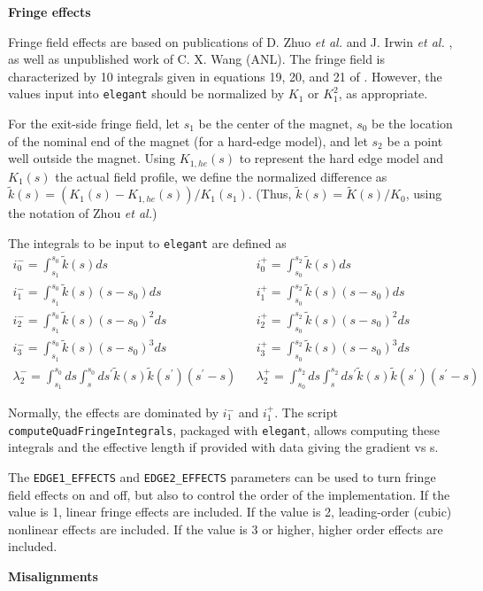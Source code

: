 {\bf Fringe effects}

Fringe field effects  are based on publications of D.  Zhuo {\em et al.} \cite{Zhou-IPAC10} and  J. Irwin {\em et
  al.} \cite{Irwin-PAC95}, as well as unpublished work of C. X. Wang (ANL).  The fringe field is characterized by 
10 integrals given in equations 19, 20, and 21 of \cite{Zhou-IPAC10}.  However, the values input into {\tt elegant}
should be normalized by $K_1$ or $K_1^2$, as appropriate.

For the exit-side fringe field, let $s_1$ be the center of the magnet, $s_0$ be the location of the nominal end of the magnet
(for a hard-edge model), and let $s_2$ be a point well outside the magnet.  
Using $K_{1,he}(s)$ to represent the hard edge model and $K_1(s)$ the actual field profile, we 
define the normalized difference as $\tilde{k}(s) = (K_1(s) - K_{1,he}(s))/K_1(s_1)$.  (Thus, $\tilde{k}(s) = \tilde{K}(s)/K_0$, using
the notation of Zhou {\em et al.})

The integrals to be input to {\tt elegant} are defined as 
\begin{eqnarray}
i_0^- = \int_{s_1}^{s_0} \tilde{k}(s) ds & & i_0^+ = \int_{s_0}^{s_2} \tilde{k}(s) ds \\
i_1^- = \int_{s_1}^{s_0} \tilde{k}(s) (s-s_0) ds & & i_1^+ = \int_{s_0}^{s_2} \tilde{k}(s) (s-s_0) ds \\
i_2^- = \int_{s_1}^{s_0} \tilde{k}(s) (s-s_0)^2 ds & & i_2^+ = \int_{s_0}^{s_2} \tilde{k}(s) (s-s_0)^2 ds \\
i_3^- = \int_{s_1}^{s_0} \tilde{k}(s) (s-s_0)^3 ds & & i_3^+ = \int_{s_0}^{s_2} \tilde{k}(s) (s-s_0)^3 ds \\
\lambda_2^- = \int_{s_1}^{s_0} ds \int_s^{s_0} ds^\prime \tilde{k}(s) \tilde{k}(s^\prime) (s^\prime-s) & & 
\lambda_2^+ = \int_{s_0}^{s_2} ds \int_s^{s_2} ds^\prime \tilde{k}(s) \tilde{k}(s^\prime) (s^\prime-s) 
\end{eqnarray}

Normally, the effects are dominated by $i_1^-$ and $i_1^+$.  The script \verb|computeQuadFringeIntegrals|,
packaged with \verb|elegant|, allows computing these integrals and the effective length if provided with 
data giving the gradient vs s.

The \verb|EDGE1_EFFECTS| and \verb|EDGE2_EFFECTS| parameters can be used to turn fringe field effects on and off, but also
to control the order of the implementation.  If the value is 1, linear fringe effects are included.  If the value is 2, 
leading-order (cubic) nonlinear effects are included.  If the value is 3 or higher, higher order effects are included.

{\bf Misalignments}


